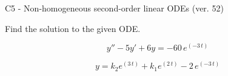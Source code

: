 \begin{exercise}
  \begin{exerciseTitle}C5 - Non-homogeneous second-order linear ODEs (ver. 52)\end{exerciseTitle}
  \begin{exerciseStatement}
    
Find the solution to the given ODE.

    
\[y''-5y'+6y = -60 \, e^{\left(-3 \, t\right)}\]

  \end{exerciseStatement}
  \begin{exerciseAnswer}
    
\[y= k_{2} e^{\left(3 \, t\right)} + k_{1} e^{\left(2 \, t\right)} - 2 \, e^{\left(-3 \, t\right)}\]

  \end{exerciseAnswer}
\end{exercise}